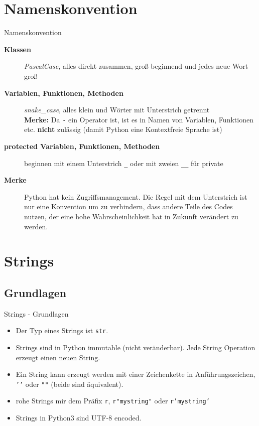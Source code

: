 \section{Namenskonvention}
\begin{frame}[fragile]{Namenskonvention}
	\begin{description}
	    \item[\textbf{Klassen}] \textit{PascalCase}, alles direkt zusammen, groß beginnend und jedes neue Wort groß
	    \item[\textbf{Variablen, Funktionen, Methoden}] \textit{snake\_case}, alles klein und Wörter mit Unterstrich getrennt \\
	    \textbf{Merke:} Da \alert{\texttt{-}} ein Operator ist, ist es in Namen von Variablen, Funktionen etc. \textbf{nicht} zulässig (damit Python eine Kontextfreie Sprache ist)
	    \item[\textbf{protected Variablen, Funktionen, Methoden}] beginnen mit einem Unterstrich \alert{\texttt{\_}} oder mit zweien \alert{\texttt{\_\_}} für private
	    \item[\textbf{Merke}] Python hat kein Zugriffsmanagement. Die Regel mit dem Unterstrich ist nur eine Konvention um zu verhindern, dass andere Teile des Codes nutzen, der eine hohe Wahrscheinlichkeit hat in Zukunft verändert zu werden.
	\end{description}
\end{frame}


\section{Strings}
\subsection{Grundlagen}
\begin{frame}[fragile]{Strings - Grundlagen}
	\begin{itemize}
	    \item Der Typ eines Strings ist \alert{\texttt{str}}.
	    \item Strings sind in Python immutable (nicht veränderbar). Jede String Operation erzeugt einen neuen String.
	    \item Ein String kann erzeugt werden mit einer Zeichenkette in Anführungszeichen, \alert{\texttt{'{}'{}}} oder \alert{\texttt{"{}"{}}} (beide sind äquivalent).
	    \item rohe Strings mir dem Präfix \alert{\texttt{r}}, \alert{\texttt{r"mystring"}} oder \alert{\texttt{r'mystring'}}
	    \item Strings in Python3 sind UTF-8 encoded.
	\end{itemize}
\end{frame}


